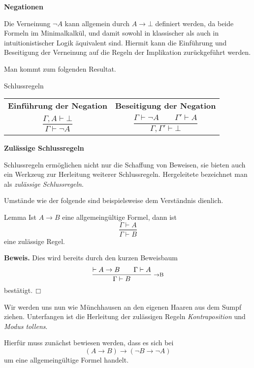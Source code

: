\documentclass[8pt]{beamer}
\newcommand{\strong}[1]{\textsf{\textbf{#1}}}
\newcommand{\infernote}[1]{\!\text{\footnotesize #1}}
\renewcommand{\qedsymbol}{\ensuremath{\Box}}
\newcommand{\centerheadline}[1]{%
  \begin{center}\strong{#1}\end{center}}
\newcommand{\parspace}{\vspace{0.8em}}
\newcommand{\cond}{\rightarrow}
\begin{document}
\begin{frame}
\centerheadline{Negationen}
\end{frame}

\begin{frame}
Die Verneinung $\neg A$ kann allgemein durch $A\cond\bot$
definiert werden, da beide Formeln im Minimalkalkül, und damit sowohl
in klassischer als auch in intuitionistischer Logik äquivalent sind.
Hiermit kann die Einführung und Beseitigung der Verneinung auf die
Regeln der Implikation zurückgeführt werden.\pause

\parspace
Man kommt zum folgenden Resultat.
\begin{block}{Schlussregeln}
\begin{center}
\begin{tabular}{c@{\qquad\quad}c}
\strong{\small Einführung der Negation}
& \strong{\small Beseitigung der Negation}\\[6pt]
$\dfrac{\Gamma,A\vdash\bot}{\Gamma\vdash\neg A}$
& $\dfrac{\Gamma\vdash\neg A\qquad\Gamma'\vdash A}{\Gamma,\Gamma'\vdash\bot}$\\
\end{tabular}
\end{center}
\end{block}
\end{frame}

\begin{frame}
\centerheadline{Zulässige Schlussregeln}
\end{frame}

\begin{frame}
Schlussregeln ermöglichen nicht nur die Schaffung von Beweisen,
sie bieten auch ein Werkzeug zur Herleitung weiterer Schlussregeln.
Hergeleitete bezeichnet man als \emph{zulässige Schlussregeln}.\pause{}

\parspace
Umstände wie der folgende sind beispielsweise
dem Verständnis dienlich.

\begin{block}{Lemma}
Ist $A\cond B$ eine allgemeingültige
Formel, dann ist
\[\dfrac{\Gamma\vdash A}{\Gamma\vdash B}\]
eine zulässige Regel.
\end{block}\pause

\parspace
\strong{Beweis.} Dies wird bereits durch den kurzen Beweisbaum
\[\dfrac{\vdash A\cond B\qquad \Gamma\vdash A}{
  \Gamma\vdash B}\;\,\infernote{$\cond$B}\]
bestätigt.\,\qedsymbol
\end{frame}

\begin{frame}
Wir werden uns nun wie Münchhausen an den eigenen Haaren aus dem
Sumpf ziehen. Unterfangen ist die Herleitung der zulässigen Regeln
\emph{Kontraposition} und \emph{Modus tollens}.\pause

\parspace
Hierfür muss zunächst bewiesen werden, dass es sich bei
\[(A\cond B)\cond (\neg B\cond\neg A)\]
um eine allgemeingültige Formel handelt.
\end{frame}
\end{document}
